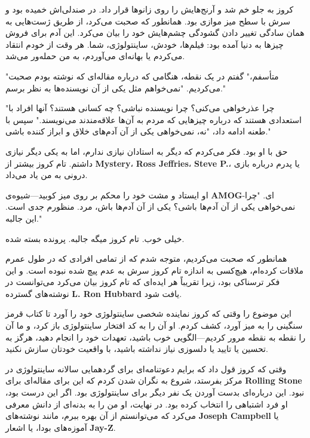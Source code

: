 کروز به جلو خم شد و آرنج‌هایش را روی زانوها قرار داد. در صندلی‌اش خمیده بود و سرش با سطح میز موازی بود. همانطور که صحبت می‌کرد، از طریق ژست‌هایی به همان سادگی تغییر دادن گشودگی چشم‌هایش خود را بیان می‌کرد. این آدم برای فروش چیزها به دنیا آمده بود: فیلم‌ها، خودش، ساینتولوژی، شما. هر وقت از خودم انتقاد می‌کردم یا بهانه‌ای می‌آوردم، به من حمله‌ور می‌شد.

"متأسفم،" گفتم در یک نقطه، هنگامی که درباره مقاله‌ای که نوشته بودم صحبت می‌کردیم. "نمی‌خواهم مثل یکی از آن نویسنده‌ها به نظر برسم."

"چرا عذرخواهی می‌کنی؟ چرا نویسنده نباشی؟ چه کسانی هستند؟ آنها افراد با استعدادی هستند که درباره چیزهایی که مردم به آن‌ها علاقه‌مندند می‌نویسند." سپس با طعنه ادامه داد، "نه، نمی‌خواهی یکی از آن آدم‌های خلاق و ابراز کننده باشی."

حق با او بود. فکر می‌کردم که دیگر به استادان نیازی ندارم، اما به یکی دیگر نیازی داشتم. تام کروز بیشتر از \textbf{Mystery}، \textbf{Ross Jeffries}، \textbf{Steve P.}، یا پدرم درباره بازی درونی به من یاد می‌داد.

او ایستاد و مشت خود را محکم بر روی میز کوبید—شیوه‌ی \textbf{AMOG}-ای. "چرا نمی‌خواهی یکی از آن آدم‌ها باشی؟ یکی از آن آدم‌ها باش، مرد. منظورم جدی است. این جالبه."

خیلی خوب. تام کروز میگه جالبه. پرونده بسته شده.

همانطور که صحبت می‌کردیم، متوجه شدم که از تمامی افرادی که در طول عمرم ملاقات کرده‌ام، هیچ‌کسی به اندازه تام کروز سرش به عدم پیچ شده نبوده است. و این فکر ترسناکی بود، زیرا تقریباً هر ایده‌ای که تام کروز بیان می‌کرد می‌توانست در نوشته‌های گسترده \textbf{L. Ron Hubbard} یافت شود.

این موضوع را وقتی که کروز نماینده شخصی ساینتولوژی خود را آورد تا کتاب قرمز سنگینی را به میز آورد، کشف کردم. او آن را به کد افتخار ساینتولوژی باز کرد، و ما آن را نقطه به نقطه مرور کردیم—الگویی خوب باشید، تعهدات خود را انجام دهید، هرگز به تحسین یا تایید یا دلسوزی نیاز نداشته باشید، با واقعیت خودتان سازش نکنید.

وقتی که کروز قول داد که برایم دعوتنامه‌ای برای گردهمایی سالانه ساینتولوژی در مرکز بفرستد، شروع به نگران شدن کردم که این برای مقاله‌ای برای \textbf{Rolling Stone} نبود. این درباره‌ای بدست آوردن یک نفر دیگر برای ساینتولوژی بود. اگر این درست بود، او فرد اشتباهی را انتخاب کرده بود. در نهایت، او من را به بدنه‌ای از دانش معرفی می‌کرد که می‌توانستم از آن بهره ببرم، مانند نوشته‌های \textbf{Joseph Campbell} یا آموزه‌های بودا، یا اشعار \textbf{Jay-Z}.